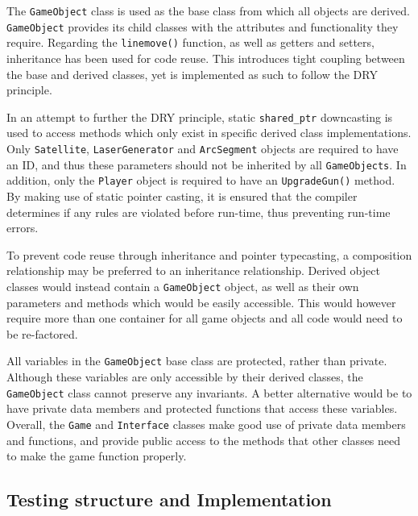 \documentclass[10pt,twocolumn]{witseiepaper}
\begin{document}
The \texttt{GameObject} class is used as the base class from which all objects are derived. \texttt{GameObject} provides its child classes with the attributes and functionality they require. Regarding the \texttt{linemove()} function, as well as getters and setters, inheritance has been used for code reuse. This introduces tight coupling between the base and derived classes, yet is implemented as such to follow the DRY principle.

In an attempt to further the DRY principle, static \texttt{shared\_ptr} downcasting is used to access methods which only exist in specific derived class implementations. Only \texttt{Satellite}, \texttt{LaserGenerator} and \texttt{ArcSegment} objects are required to have an ID, and thus these parameters should not be inherited by all \texttt{GameObjects}. In addition, only the \texttt{Player} object is required to have an \texttt{UpgradeGun()} method. By making use of static pointer casting, it is ensured that the compiler determines if any rules are violated before run-time, thus preventing run-time errors.


To prevent code reuse through inheritance and pointer typecasting, a composition relationship may be preferred to an inheritance relationship.  Derived object classes would instead contain a \texttt{GameObject} object, as well as their own parameters and methods which would be easily accessible. This would however require more than one container for all game objects and all code would need to be re-factored.

All variables in the \texttt{GameObject} base class are protected, rather than private. Although these variables are only accessible by their derived classes, the \texttt{GameObject} class cannot preserve any invariants. A better alternative would be to have private data members and protected functions that access these variables. Overall, the \texttt{Game} and \texttt{Interface} classes make good use of private data members and functions, and provide public access to the methods that other classes need to make the game function properly. 


\subsection{Testing structure and Implementation}
\end{document}
